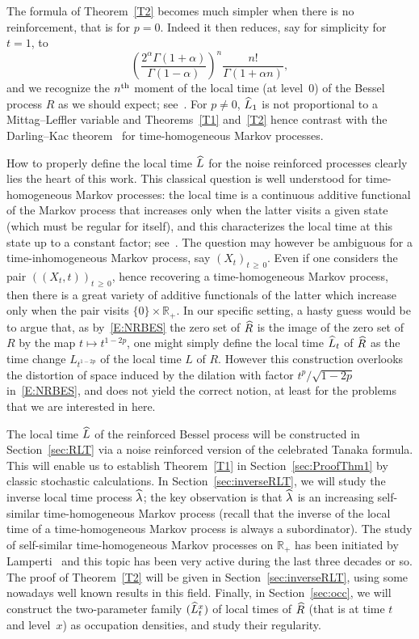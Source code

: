 \documentclass[10pt]{amsart}
\theoremstyle{definition}\newtheorem{defi}[theo]{Definition}\newtheorem{rema}[theo]{Remark}\newtheorem{exam}[theo]{Example}\newtheorem{exem}[theo]{Example}\newtheorem{nota}[theo]{Notation}
\renewcommand{\hat}[1]{\widehat{#1}}
\newcommand{\R}{\mathbb{R}}
\let\oldhat\hat
\renewcommand*{\hat}[1]{\mathchoice{\widehat{#1}}{\widehat{#1}}{\oldhat{#1}}{\oldhat{#1}}}
\begin{document}
The formula of Theorem~\ref{T2} becomes much simpler when there is no reinforcement, that is for $p=0$. Indeed it then reduces, say for simplicity for $t=1$, to
\[
\left(\frac{2^{\alpha}\Gamma(1+\alpha)}{\Gamma(1-\alpha)}\right)^n \frac{n!}{\Gamma(1+\alpha n)},
\]
and we recognize the $n^{\rm th}$ moment of the local time (at level~$0$) of the Bessel process $R$ as we should expect; see~\cite[Proposition~3.4]{DRVY}. For $p\neq 0$, $\hat{L}_1$ is not proportional to a Mittag--Leffler variable and Theorems~\ref{T1} and~\ref{T2} hence contrast with the Darling--Kac theorem~\cite{DK} for time-homogeneous Markov processes.

How to properly define the local time $\hat{L}$ for the noise reinforced processes clearly lies the heart of this work. This classical question is well understood for time-homogeneous Markov processes: the local time is a continuous additive functional of the Markov process that increases only when the latter visits a given state (which must be regular for itself), and this characterizes the local time at this state up to a constant factor; see~\cite[Definition~V.3.12 and Theorem~VI.3.13]{BlGe}. The question may however be ambiguous for a time-inhomogeneous Markov process, say $(X_t)_{t\,\geq \,0}$. Even if one considers the pair $((X_t,t))_{t\,\geq\,0}$, hence recovering a time-homogeneous Markov process, then there is a great variety of additive functionals of the latter which increase only when the pair visits $\{0\}\times \R_+$. In our specific setting, a hasty guess would be to argue that, as by~\eqref{E:NRBES} the zero set of $\hat R$ is the image of the zero set of $R$ by the map $t\mapsto t^{1-2p}$, one might simply define the local time $\hat{L}_t$ of $\hat R$ as the time change ${L}_{t^{1-2p}}$ of the local time ${L}$ of $R$. However this construction overlooks the distortion of space induced by the dilation with factor $t^p/\sqrt{1-2p}$ in~\eqref{E:NRBES}, and does not yield the correct notion, at least for the problems that we are interested in here.

The local time $\hat{L}$ of the reinforced Bessel process will be constructed in Section~\ref{sec:RLT} via a noise reinforced version of the celebrated Tanaka formula. This will enable us to establish Theorem~\ref{T1} in Section~\ref{sec:ProofThm1} by classic stochastic calculations. In Section~\ref{sec:inverseRLT}, we will study the inverse local time process $\hat \lambda$; the key observation is that $\hat \lambda$ is an increasing self-similar time-homogeneous Markov process (recall that the inverse of the local time of a time-homogeneous Markov process is always a subordinator). The study of self-similar time-homogeneous Markov processes on $\R_+$ has been initiated by Lamperti~\cite{Lamperti} and this topic has been very active during the last three decades or so. The proof of Theorem~\ref{T2} will be given in Section~\ref{sec:inverseRLT}, using some nowadays well known results in this field. Finally, in Section~\ref{sec:occ}, we will construct the two-parameter family $(\hat{L}^x_t)$ of local times of $\hat R$ (that is at time $t$ and level~$x$) as occupation densities, and study their regularity.
\end{document}
